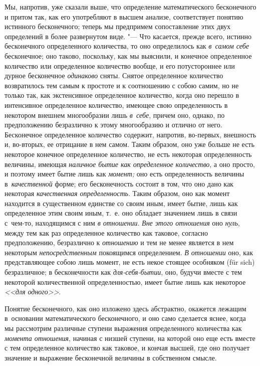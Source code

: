 Мы, напротив, уже сказали выше, что определение математического бесконечного и
притом так, как его употребляют в высшем анализе, соответствует понятию
истинного бесконечного; теперь мы предпримем сопоставление этих двух
определений в более развернутом виде. "--- Что касается, прежде всего, истинно
бесконечного определенного количества, то оно определилось как {\em в~самом
себе} бесконечное; оно таково, поскольку, как мы выяснили, и конечное
определенное количество или определенное количество вообще, и его потустороннее
или дурное бесконечное {\em одинаково} сняты. Снятое определенное количество
возвратилось тем самым к простоте и к соотношению с собою самим, но не только
так, как экстенсивное определенное количество, когда оно перешло в интенсивное
определенное количество, имеющее свою определенность в некотором внешнем
многообразии лишь {\em в~себе}, причем оно, однако, по предположению
безразлично к этому многообразию и отлично от него. Бесконечное определенное
количество содержит, напротив, во-первых, внешность и, во-вторых, ее отрицание
в нем самом. Таким образом, оно уже больше не есть некоторое конечное
определенное количество, не есть некоторая определенность величины, имеющая
{\em наличное бытие как определенное количество}, а оно просто, и поэтому имеет
бытие лишь как {\em момент;} оно есть определенность величины
в~{\em качественной} форме; его бесконечность состоит в том, что оно дано как
некоторая {\em качественная определенность}. Таким образом, оно как момент
находится в существенном единстве со своим иным, имеет бытие, лишь как
определенное этим своим иным, т.~е. оно обладает значением лишь в связи
с~чем-то, находящимся с ним {\em в отношении}. {\em Вне этого отношения} оно
{\em нуль}, между тем как раз определенное количество как таковое, согласно
предположению, безразлично к {\em отношению} и тем не менее является в нем
некоторым {\em непосредственным} покоящимся определением. {\em В отношении}
оно, как представляющее собою лишь момент, не есть некое стоящее особняком
(für sich) безразличное; в бесконечности как {\em для-себя-бытии}, оно, будучи
вместе с тем некоторой количественной определенностью, имеет бытие лишь как
некоторое {\em <<для одного>>}.

Понятие бесконечного, как оно изложено здесь абстрактно, окажется лежащим
в~основании математического бесконечного, и оно само сделается яснее, когда
мы рассмотрим различные ступени выражения определенного количества как
{\em момента отношения}, начиная с низшей ступени, на которой оно еще есть
вместе с тем определенное количество как таковое, и кончая высшей, где оно
получает значение и выражение бесконечной величины в собственном смысле.

